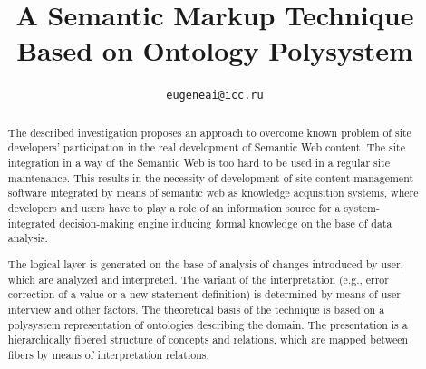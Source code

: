 \documentclass[conference]{IEEEtran}
\begin{document}
\title{A Semantic Markup Technique Based on Ontology Polysystem}
  \author{%
\texttt{\small eugeneai@icc.ru}
}


\maketitle

\def\thepage{Page \arabic{page}}

\begin{abstract}
The described investigation proposes an approach to overcome known problem of site developers' participation in the real development of Semantic Web content.  The site integration in a way of the Semantic Web is too hard to be used in a regular site maintenance.  This results in the necessity of development of site content management software integrated by means of semantic web as knowledge acquisition systems, where developers and users have to play a role of an information source for a system-integrated decision-making engine inducing formal knowledge on the base of data analysis.

The logical layer is generated on the base of analysis of changes introduced by user, which are analyzed and interpreted.  The variant of the interpretation (e.g., error correction of a value or a new statement definition) is determined by means of user interview and other factors.  The theoretical basis of the technique is based on a polysystem representation of ontologies describing the domain.  The presentation is a hierarchically fibered structure of concepts and relations, which are mapped between fibers by means of interpretation relations.
\end{abstract}


%
\IEEEpeerreviewmaketitle
\end{document}
